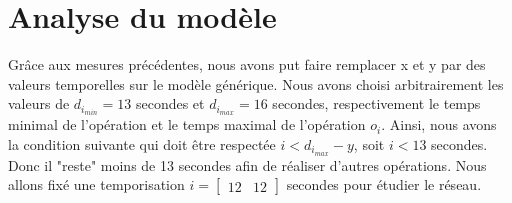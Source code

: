 \section{Analyse du modèle}
Grâce aux mesures précédentes, nous avons put faire remplacer x et y par des valeurs temporelles sur le modèle générique. Nous avons choisi arbitrairement les valeurs de $d_{i_{min}} = 13$ secondes et $d_{i_{max}} = 16$ secondes, respectivement le temps minimal de l'opération et le temps maximal de l'opération $o_i$.  Ainsi, nous avons la condition suivante qui doit être respectée $i <d_{i_{max}}-y$, soit $i < 13$ secondes. Donc il "reste" moins de 13 secondes afin de réaliser d'autres opérations. Nous allons fixé une temporisation  $i=\begin{bmatrix}
12& 12
\end{bmatrix}$ secondes pour étudier le réseau. 

